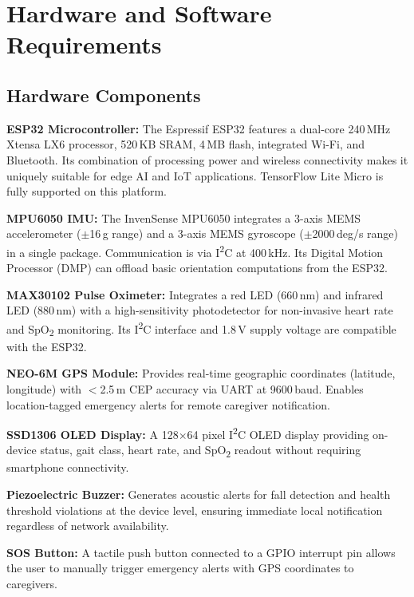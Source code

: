 \documentclass[conference]{IEEEtran}
\begin{document}
\section{Hardware and Software Requirements}

\subsection{Hardware Components}

\textbf{ESP32 Microcontroller:} The Espressif ESP32 features a dual-core 240\,MHz Xtensa LX6 processor, 520\,KB SRAM, 4\,MB flash, integrated Wi-Fi, and Bluetooth. Its combination of processing power and wireless connectivity makes it uniquely suitable for edge AI and IoT applications. TensorFlow Lite Micro is fully supported on this platform.

\textbf{MPU6050 IMU:} The InvenSense MPU6050 integrates a 3-axis MEMS accelerometer ($\pm$16\,g range) and a 3-axis MEMS gyroscope ($\pm$2000\,deg/s range) in a single package. Communication is via I\textsuperscript{2}C at 400\,kHz. Its Digital Motion Processor (DMP) can offload basic orientation computations from the ESP32.

\textbf{MAX30102 Pulse Oximeter:} Integrates a red LED (660\,nm) and infrared LED (880\,nm) with a high-sensitivity photodetector for non-invasive heart rate and SpO\textsubscript{2} monitoring. Its I\textsuperscript{2}C interface and 1.8\,V supply voltage are compatible with the ESP32.

\textbf{NEO-6M GPS Module:} Provides real-time geographic coordinates (latitude, longitude) with $<$2.5\,m CEP accuracy via UART at 9600\,baud. Enables location-tagged emergency alerts for remote caregiver notification.

\textbf{SSD1306 OLED Display:} A 128$\times$64 pixel I\textsuperscript{2}C OLED display providing on-device status, gait class, heart rate, and SpO\textsubscript{2} readout without requiring smartphone connectivity.

\textbf{Piezoelectric Buzzer:} Generates acoustic alerts for fall detection and health threshold violations at the device level, ensuring immediate local notification regardless of network availability.

\textbf{SOS Button:} A tactile push button connected to a GPIO interrupt pin allows the user to manually trigger emergency alerts with GPS coordinates to caregivers.
\end{document}
